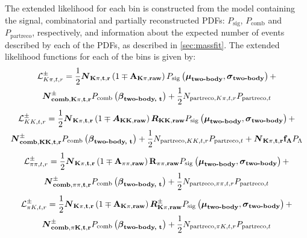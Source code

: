 The extended likelihood for each bin is constructed from the model containing the signal, combinatorial and partially reconstructed PDFs: $P_{\text{sig}}$, $P_{\text{comb}}$ and $P_{\text{partreco}}$, respectively, and information about the expected number of events described by each of the PDFs, as described in \sect\ref{sec:massfit}. The extended likelihood functions for each of the bins is given by:
\begin{multline}
\mathcal{L}_{K\pi, t, r}^{\pm} = \frac{1}{2}\mathbf{\boldsymbol N_{K\pi, t, r}}\left(1 \mp \mathbf{A_{K\pi, raw}}\right)P_{\text{sig}}\left(\mathbf{\boldsymbol\mu_\text{\textbf{two-body}}},\mathbf{\boldsymbol\sigma_\text{\textbf{two-body}}}\right) + \\ \mathbf{\boldsymbol N_{\textbf{comb}, K\pi, t, r}^{\pm}}P_{\text{comb}}\left(\mathbf{\boldsymbol\beta_\text{\textbf{two-body, t}}}\right) + \frac{1}{2}N_{\text{partreco}, K\pi, t, r}P_{\text{partreco}, t}
\label{kpilikelihood}
\end{multline}
\begin{multline}
\mathcal{L}_{KK, t, r}^{\pm} = \frac{1}{2}\mathbf{\boldsymbol N_{K\pi, t, r}}\left(1 \mp \mathbf{\boldsymbol A_{KK, raw}}\right)\mathbf{\boldsymbol R_{KK, raw}} P_{\text{sig}}\left(\mathbf{\boldsymbol\mu_\text{\textbf{two-body}}},\mathbf{\boldsymbol\sigma_\text{\textbf{two-body}}}\right) + \\ \mathbf{\boldsymbol N_{\textbf{comb}, KK, t, r}^{\pm}}P_{\text{comb}}\left(\mathbf{\boldsymbol\beta_\text{\textbf{two-body, t}}}\right) + \frac{1}{2}N_{\text{partreco}, KK, t, r}P_{\text{partreco}, t} + \mathbf{\boldsymbol N_{K\pi, t, r}}\mathbf{f_{\Lambda}}P_{\Lambda}
\end{multline}
\begin{multline}
\mathcal{L}_{\pi\pi, t, r}^{\pm} = \frac{1}{2}\mathbf{\boldsymbol N_{K\pi, t, r}}\left(1 \mp \mathbf{A_{\pi\pi, raw}}\right)\mathbf{R_{\pi\pi, raw}} P_{\text{sig}}\left(\mathbf{\boldsymbol\mu_\text{\textbf{two-body}}},\mathbf{\boldsymbol\sigma_\text{\textbf{two-body}}}\right) + \\ \mathbf{\boldsymbol N_{\textbf{comb}, \pi\pi, t, r}^{\pm}}P_{\text{comb}}\left(\mathbf{\boldsymbol\beta_\text{\textbf{two-body, t}}}\right) + \frac{1}{2}N_{\text{partreco}, \pi\pi, t, r}P_{\text{partreco}, t}
\end{multline}
\begin{multline}
\mathcal{L}_{\pi K, t, r}^{\pm} = \frac{1}{2}\mathbf{\boldsymbol N_{K\pi, t, r}}\left(1 \mp \mathbf{A_{K\pi, raw}}\right)\mathbf{\boldsymbol R_{K\pi, raw}^{\pm}} P_{\text{sig}}\left(\mathbf{\boldsymbol\mu_\text{\textbf{two-body}}},\mathbf{\boldsymbol\sigma_\text{\textbf{two-body}}}\right) + \\ \mathbf{\boldsymbol N_{\textbf{comb}, \pi K, t, r}^{\pm}}P_{\text{comb}}\left(\mathbf{\boldsymbol\beta_\text{\textbf{two-body, t}}}\right) + \frac{1}{2}N_{\text{partreco}, \pi K, t, r}P_{\text{partreco}, t}
\end{multline}
